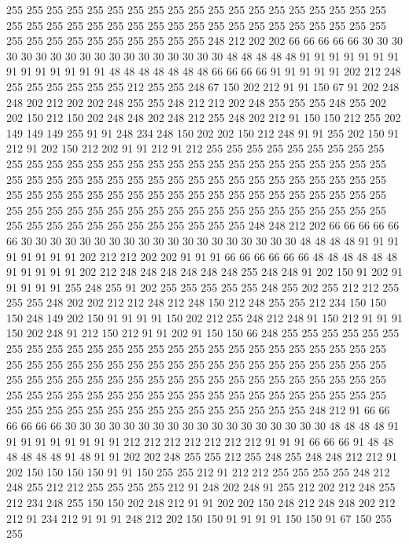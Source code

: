 255 255 255 255 255 255 255 255 255 255 255 255 255 255 255 255 255 255 255 255
255 255 255 255 255 255 255 255 255 255 255 255 255 255 255 255 255 255 255 255
255 255 255 255 255 255 255 255 248 212 202 202 66 66 66 66 66 30 30 30
30 30 30 30 30 30 30 30 30 30 30 30 30 30 30 48 48 48 48 48
91 91 91 91 91 91 91 91 91 91 91 91 91 91 48 48 48 48 48 48
48 66 66 66 66 91 91 91 91 91 202 212 248 255 255 255 255 255 255 212
255 255 248 67 150 202 212 91 91 150 67 91 202 248 248 202 212 202 202 248
255 255 248 212 212 202 248 255 255 255 248 255 202 202 150 212 150 202 248 248
202 248 212 255 248 202 212 91 150 150 212 255 202 149 149 149 255 91 91 248
234 248 150 202 202 150 212 248 91 91 255 202 150 91 212 91 202 150 212 202
91 91 212 91 212 255 255 255 255 255 255 255 255 255 255 255 255 255 255 255
255 255 255 255 255 255 255 255 255 255 255 255 255 255 255 255 255 255 255 255
255 255 255 255 255 255 255 255 255 255 255 255 255 255 255 255 255 255 255 255
255 255 255 255 255 255 255 255 255 255 255 255 255 255 255 255 255 255 255 255
255 255 255 255 255 255 255 255 255 255 255 255 255 255 255 255 255 255 255 255
255 255 248 248 212 202 66 66 66 66 66 66 30 30 30 30 30 30 30 30
30 30 30 30 30 30 30 30 30 30 30 48 48 48 48 91 91 91 91 91
91 91 91 202 212 212 202 202 91 91 91 66 66 66 66 66 66 48 48 48
48 48 48 91 91 91 91 91 202 212 248 248 248 248 248 248 255 248 248 91
202 150 91 202 91 91 91 91 91 255 248 255 91 202 255 255 255 255 255 248
255 202 255 212 212 255 255 255 248 202 202 212 212 248 212 248 150 212 248 255
255 212 234 150 150 150 248 149 202 150 91 91 91 91 150 202 212 255 248 212
248 91 150 212 91 91 91 150 202 248 91 212 150 212 91 91 202 91 150 150
66 248 255 255 255 255 255 255 255 255 255 255 255 255 255 255 255 255 255 255
255 255 255 255 255 255 255 255 255 255 255 255 255 255 255 255 255 255 255 255
255 255 255 255 255 255 255 255 255 255 255 255 255 255 255 255 255 255 255 255
255 255 255 255 255 255 255 255 255 255 255 255 255 255 255 255 255 255 255 255
255 255 255 255 255 255 255 255 255 255 255 255 255 255 255 255 255 255 255 248
212 91 66 66 66 66 66 66 30 30 30 30 30 30 30 30 30 30 30 30
30 30 30 30 30 30 48 48 48 48 91 91 91 91 91 91 91 91 91 212
212 212 212 212 212 212 91 91 91 66 66 66 91 48 48 48 48 48 48 91
48 91 91 202 202 248 255 255 212 255 248 255 248 248 212 212 91 202 150 150
150 150 91 91 150 255 255 212 91 212 212 255 255 255 255 248 212 248 255 212
212 255 255 255 255 212 91 248 202 248 91 255 212 202 212 248 255 212 234 248
255 150 150 202 248 212 91 91 202 202 150 248 212 248 248 202 212 212 91 234
212 91 91 91 248 212 202 150 150 91 91 91 91 150 150 91 67 150 255 255
